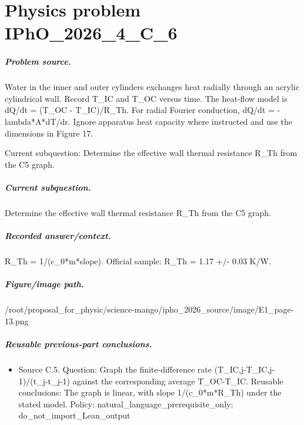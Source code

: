
\chapter{Physics problem IPhO\_2026\_4\_C\_6}
\label{ch:IPhO2026Problems_problem_IPhO_2026_4_C_6}

\paragraph{Problem source.}
Water in the inner and outer cylinders exchanges heat radially through an
acrylic cylindrical wall.  Record T\_IC and T\_OC versus time.  The heat-flow
model is dQ/dt = (T\_OC - T\_IC)/R\_Th.  For radial Fourier conduction,
dQ/dt = -lambda*A*dT/dr.  Ignore apparatus heat capacity where instructed and
use the dimensions in Figure 17.

Current subquestion:
Determine the effective wall thermal resistance R\_Th from the C5 graph.

\paragraph{Current subquestion.}
Determine the effective wall thermal resistance R\_Th from the C5 graph.

\paragraph{Recorded answer/context.}
R\_Th = 1/(c\_0*m*slope). Official sample: R\_Th = 1.17 +/- 0.03 K/W.

\paragraph{Figure/image path.}
/root/proposal\_for\_physic/science-mango/ipho\_2026\_source/image/E1\_page-13.png

\paragraph{Reusable previous-part conclusions.}
\begin{itemize}
\item Source C.5. Question: Graph the finite-difference rate (T\_IC,j-T\_IC,j-1)/(t\_j-t\_j-1) against the corresponding average T\_OC-T\_IC. Reusable conclusions: The graph is linear, with slope 1/(c\_0*m*R\_Th) under the stated model. Policy: natural\_language\_prerequisite\_only; do\_not\_import\_Lean\_output
\end{itemize}

